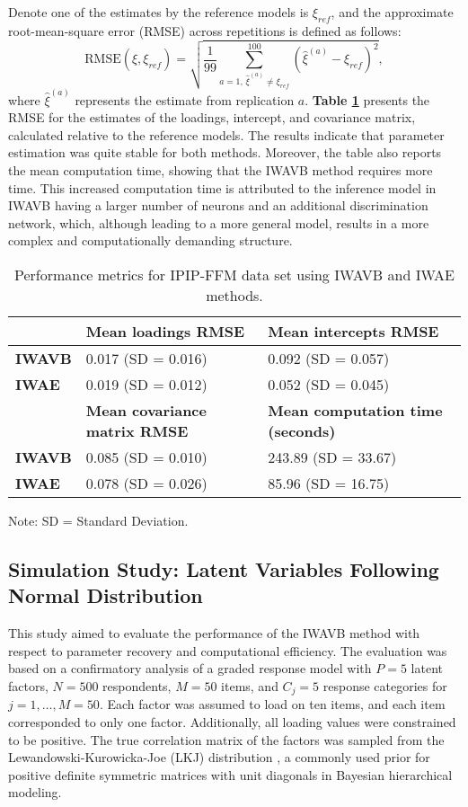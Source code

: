 \documentclass[a4paper,12pt]{article}
\theoremstyle{plain} %
\theoremstyle{remark} %
\theoremstyle{definition} %
\begin{document}
Denote one of the estimates by the reference models is $\xi_{ref}$, and the approximate root-mean-square error (RMSE) across repetitions is defined as follows:
\begin{equation}\label{eq:rmse}
    \text{RMSE}(\hat{\xi},\xi_{ref}) = \sqrt{\frac{1}{99}\sum\limits_{a=1,\,\hat{\xi}^{(a)}\neq\xi_{ref}}^{100}(\hat{\xi}^{(a)}-\xi_{ref})^2},
\end{equation}
where $\hat{\xi}^{(a)}$ represents the estimate from replication $a$. \textbf{Table \ref{tab:emp_results}} presents the RMSE for the estimates of the loadings, intercept, and covariance matrix, calculated relative to the reference models. The results indicate that parameter estimation was quite stable for both methods. Moreover, the table also reports the mean computation time, showing that the IWAVB method requires more time. This increased computation time is attributed to the inference model in IWAVB having a larger number of neurons and an additional discrimination network, which, although leading to a more general model, results in a more complex and computationally demanding structure.
\begin{table}[H]
\centering
\caption{Performance metrics for IPIP-FFM data set using IWAVB and IWAE methods.}
\label{tab:emp_results}
\begin{tabular*}{\linewidth}{@{\extracolsep{\fill}} lll}
\toprule
 & \textbf{Mean loadings RMSE} & \textbf{Mean intercepts RMSE} \\
\midrule
\textbf{IWAVB} & 0.017 (SD = 0.016) & 0.092 (SD = 0.057) \\
\textbf{IWAE} & 0.019 (SD = 0.012) & 0.052 (SD = 0.045) \\
\midrule
 & \textbf{Mean covariance matrix RMSE} & \textbf{Mean computation time (seconds)} \\
\midrule
\textbf{IWAVB} & 0.085 (SD = 0.010) & 243.89 (SD = 33.67) \\
\textbf{IWAE} & 0.078 (SD = 0.026) & 85.96 (SD = 16.75) \\
\bottomrule
\end{tabular*}

\vspace{0.5em}
{\footnotesize Note: SD = Standard Deviation.}
\end{table}

\subsection{Simulation Study: Latent Variables Following Normal Distribution }
This study aimed to evaluate the performance of the IWAVB method with respect to parameter recovery and computational efficiency. The evaluation was based on a confirmatory analysis of a graded response model with $P=5$ latent factors, $N=500$ respondents, $M=50$ items, and $C_j=5$ response categories for $j=1,\dots,M=50$. Each factor was assumed to load on ten items, and each item corresponded to only one factor. Additionally, all loading values were constrained to be positive. The true correlation matrix of the factors was sampled from the Lewandowski-Kurowicka-Joe (LKJ) distribution \citep{lewandowski2009generating}, a commonly used prior for positive definite symmetric matrices with unit diagonals in Bayesian hierarchical modeling.
\end{document}
